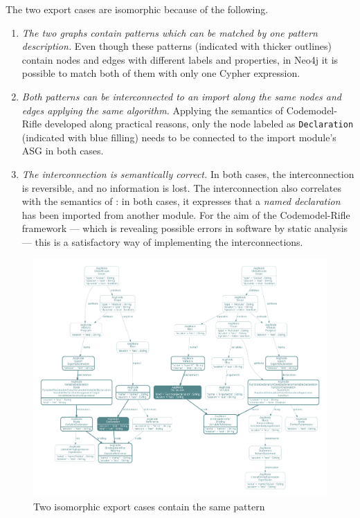 The two export cases are isomorphic because of the following.
\begin{enumerate}[label=\alph*)]
\item \emph{The two graphs contain patterns which can be matched by one pattern description.} Even though these patterns (indicated with thicker outlines) contain nodes and edges with different labels and properties, in Neo4j it is possible to match both of them with only one Cypher expression.
\item \emph{Both patterns can be interconnected to an import along the same nodes and edges applying the same algorithm.} Applying the semantics of Codemodel-Rifle developed along practical reasons, only the node labeled as \lstinline{Declaration} (indicated with blue filling) needs to be connected to the import module's ASG in both cases.
\item \emph{The interconnection is semantically correct.} In both cases, the interconnection is reversible, and no information is lost. The interconnection also correlates with the semantics of \es: in both cases, it expresses that a \emph{named declaration} has been imported from another module. For the aim of the Codemodel-Rifle framework — which is revealing possible errors in software by static analysis — this is a satisfactory way of implementing the interconnections.
\end{enumerate}

\begin{figure}[!htb]
	\centerfloat
	\includegraphics[width=\textwidth+3cm, trim=12mm 12mm 12mm 12mm,clip]{figures/export-declaration-demonstration.pdf}
	\caption{Two isomorphic export cases contain the same pattern}
	\label{fig:export-declaration-demonstration}
\end{figure}

